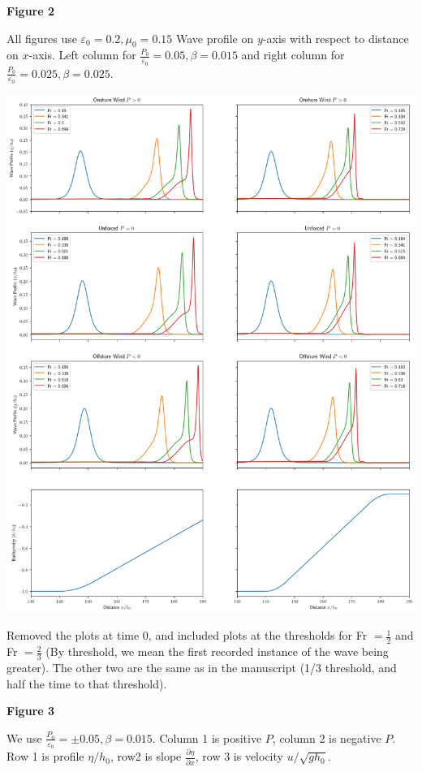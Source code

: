 \documentclass[10pt,a4paper]{article}
\begin{document}
{\bf\huge Figure 2}

All figures use $\varepsilon_0 = 0.2,\mu_0 = 0.15$
Wave profile on $y$-axis with respect to distance on $x$-axis. Left column for $\frac{P_0}{\varepsilon_0} = 0.05, \beta = 0.015$ and right column for $\frac{P_0}{\varepsilon_0} = 0.025, \beta = 0.025$.

\includegraphics[scale=0.35]{Fig2.png}

Removed the plots at time $0$, and included plots at the thresholds for Fr $=\frac{1}{2}$ and Fr $=\frac{2}{3}$ (By threshold, we mean the first recorded instance of the wave being greater).
The other two are the same as in the manuscript (1/3 threshold, and half the time to that threshold).
\pagebreak


{\bf\huge Figure 3}


We use $\frac{P_0}{\varepsilon_0} = \pm0.05, \beta = 0.015$. Column 1 is positive $P$, column 2 is negative $P$. Row 1 is profile $\eta/h_0$, row2 is slope $\frac{\partial \eta}{\partial x}$, row 3 is velocity $u/\sqrt{gh_0}$.
\end{document}
